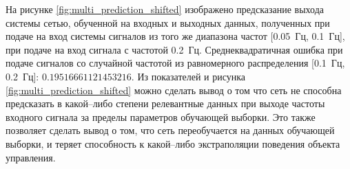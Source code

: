 \documentclass[12pt, oneside]{extbook}
\begin{document}
\begin{flushleft}
На рисунке \ref{fig:multi_prediction_shifted} изображено предсказание выхода системы сетью, обученной на входных и выходных данных, полученных при подаче на вход системы сигналов из того же диапазона частот [0.05~Гц, 0.1~Гц], при подаче на вход сигнала с частотой 0.2~Гц. Среднеквадратичная ошибка при подаче сигналов со случайной частотой из равномерного распределения [0.1~Гц, 0.2~Гц]: $ 0.19516661121453216$. Из показателей и рисунка \ref{fig:multi_prediction_shifted} можно сделать вывод о том что сеть не способна предсказать в какой--либо степени релевантные данных при выходе частоты входного сигнала за пределы параметров обучающей выборки. Это также позволяет сделать вывод о том, что сеть переобучается на данных обучающей выборки, и теряет способность к какой--либо экстраполяции поведения объекта управления. 
\par
\begin{figure}[!ht]
     \hfill
     \centering
\end{figure}
\end{flushleft}
\end{document}

